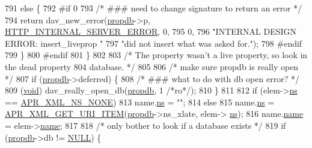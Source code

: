 \begin{DoxyCode}
791             \textcolor{keywordflow}{else} \{
792 \textcolor{preprocessor}{#if 0}
793                 \textcolor{comment}{/* ### need to change signature to return an error */}
794                 \textcolor{keywordflow}{return} dav\_new\_error(\hyperlink{group__MOD__DAV_gac428117c2c7c0121d6e49a52085fd196}{propdb}->p, \hyperlink{group__HTTP__Status_ga5d9777e02c26063c2985e39ef71091d2}{HTTP\_INTERNAL\_SERVER\_ERROR},
       0,
795                                      0,
796                                      \textcolor{stringliteral}{"INTERNAL DESIGN ERROR: insert\_liveprop "}
797                                      \textcolor{stringliteral}{"did not insert what was asked for."});
798 \textcolor{preprocessor}{#endif}
799             \}
800 \textcolor{preprocessor}{#endif}
801         \}
802 
803         \textcolor{comment}{/* The property wasn't a live property, so look in the dead property}
804 \textcolor{comment}{           database. */}
805 
806         \textcolor{comment}{/* make sure propdb is really open */}
807         \textcolor{keywordflow}{if} (\hyperlink{group__MOD__DAV_gac428117c2c7c0121d6e49a52085fd196}{propdb}->deferred) \{
808             \textcolor{comment}{/* ### what to do with db open error? */}
809             (\hyperlink{group__MOD__ISAPI_gacd6cdbf73df3d9eed42fa493d9b621a6}{void}) dav\_really\_open\_db(\hyperlink{group__MOD__DAV_gac428117c2c7c0121d6e49a52085fd196}{propdb}, 1 \textcolor{comment}{/*ro*/});
810         \}
811 
812         \textcolor{keywordflow}{if} (elem->\hyperlink{structapr__xml__elem_a613ea31964572df7b41f5a9da8d0982e}{ns} == \hyperlink{group__APR__Util__XML_ga2eed42f7f5e2b1932141f6bb5594b042}{APR\_XML\_NS\_NONE})
813             name.\hyperlink{structdav__prop__name_ac32f7eed5e8b6b8fd7f193b253b036dc}{ns} = \textcolor{stringliteral}{""};
814         \textcolor{keywordflow}{else}
815             name.\hyperlink{structdav__prop__name_ac32f7eed5e8b6b8fd7f193b253b036dc}{ns} = \hyperlink{group__APR__Util__XML_gaf31ae94be9e1db1ee0175f7c0c40e3a7}{APR\_XML\_GET\_URI\_ITEM}(\hyperlink{group__MOD__DAV_gac428117c2c7c0121d6e49a52085fd196}{propdb}->ns\_xlate, elem->
      \hyperlink{structapr__xml__elem_a613ea31964572df7b41f5a9da8d0982e}{ns});
816         name.\hyperlink{structdav__prop__name_ac6a5df59f29b22f0d9129257d49ef3e7}{name} = elem->\hyperlink{structapr__xml__elem_a5b2fb684a9cfb244f88ad88f539fe3d6}{name};
817 
818         \textcolor{comment}{/* only bother to look if a database exists */}
819         \textcolor{keywordflow}{if} (\hyperlink{group__MOD__DAV_gac428117c2c7c0121d6e49a52085fd196}{propdb}->db != \hyperlink{pcre_8txt_ad7f989d16aa8ca809a36bc392c07fba1}{NULL}) \{

\end{DoxyCode}
